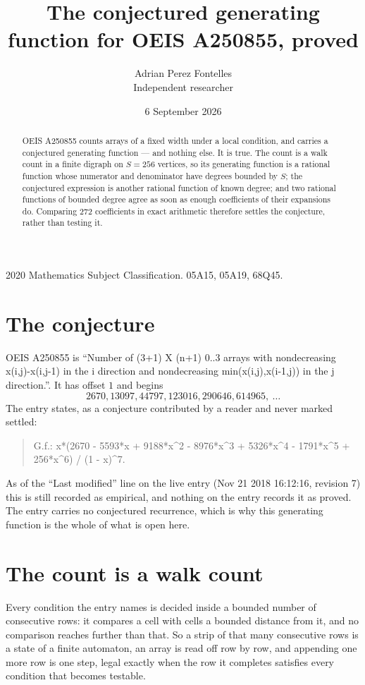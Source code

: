 \documentclass[11pt,a4paper]{article}
\title{The conjectured generating function for OEIS A250855, proved}
\author{Adrian Perez Fontelles\\ \small Independent researcher}
\date{6 September 2026}
\theoremstyle{plain}
\theoremstyle{definition}
\begin{document}
\maketitle

\begin{abstract}
OEIS A250855 counts arrays of a fixed width under a local condition, and carries a conjectured
generating function --- and nothing else. It is true. The count is a walk count in a finite
digraph on $S=256$ vertices, so its generating function is a rational function whose numerator
and denominator have degrees bounded by $S$; the conjectured expression is another rational
function of known degree; and two rational functions of bounded degree agree as soon as enough
coefficients of their expansions do. Comparing $272$ coefficients in exact arithmetic
therefore settles the conjecture, rather than testing it.
\end{abstract}

\noindent\small 2020 Mathematics Subject Classification. 05A15, 05A19, 68Q45.\normalsize

\section{The conjecture}

OEIS A250855 is ``Number of (3+1) X (n+1) 0..3 arrays with nondecreasing x(i,j)-x(i,j-1) in the i direction and nondecreasing min(x(i,j),x(i-1,j)) in the j direction.''. It has offset $1$ and begins
\[
2670, 13097, 44797, 123016, 290646, 614965,\ \dots
\]
The entry states, as a conjecture contributed by a reader and never marked settled:
\begin{quote}
G.f.: x*(2670 - 5593*x + 9188*x\^{}2 - 8976*x\^{}3 + 5326*x\^{}4 - 1791*x\^{}5 + 256*x\^{}6) / (1 - x)\^{}7.
\end{quote}
As of the ``Last modified'' line on the live entry (Nov 21 2018 16:12:16, revision 7) this is still
recorded as empirical, and nothing on the entry records it as proved. The entry carries no
conjectured recurrence, which is why this generating function is the whole of what is open
here.

\section{The count is a walk count}

Every condition the entry names is decided inside a bounded number of consecutive rows: it
compares a cell with cells a bounded distance from it, and no comparison reaches further than
that. So a strip of that many consecutive rows is a state of a finite automaton, an array is
read off row by row, and appending one more row is one step, legal exactly when the row it
completes satisfies every condition that becomes testable.
\end{document}
